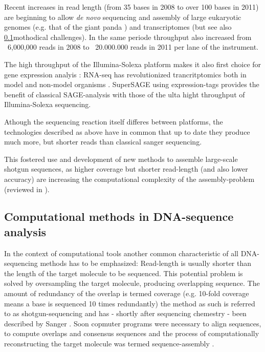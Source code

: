 Recent increases in read length (from 35 bases in 2008 to over 100
bases in 2011) are beginning to allow \textit{de novo} sequencing and
assembly of large eukaryotic genomes (e.g. that of the giant panda
\cite{pmid20010809}) and transcriptomes \cite{pmid21679424} (but see
also \ref{sec:comp-meth-dna}mothodical challenges). In the same
periode throughput also increased from ~6,000,000 reads in 2008 to
~20.000.000 reads in 2011 per lane of the instrument.

The high throughput of the Illumina-Solexa platform makes it also
first choice for gene expression analyis \cite{pmid21627854}: RNA-seq
has revolutionized trancritptomics both in model and non-model
organisms \cite{pmid19015660}. SuperSAGE \cite{pmid20967605} using
expression-tags provides the benefit of classical SAGE-analysis
\cite{pmid7570003} with those of the ulta hight throughput of
Illumina-Solexa sequencing.

Athough the sequencing reaction itself differes between platforms, the
technologies described as above have in common that up to date they
produce much more, but shorter reads than classical sanger sequencing.

This fostered use and development of new methods to assemble
large-scale shotgun sequences, as higher coverage but shorter
read-length (and also lower accuracy) are increasing the computational
complexity of the assembly-problem (reviewed in \cite{pmid20211242}).

\subsection{Computational methods in DNA-sequence analysis}
\label{sec:comp-meth-dna}

In the context of computational tools another common characteristic of
all DNA-sequencing methods has to be emphasized: Read-length is
usually shorter than the length of the target molecule to be
sequenced. This potential problem is solved by oversampling the target
molecule, producing overlapping sequence. The amount of redundancy of
the overlap is termed coverage (e.g. 10-fold coverage means a base is
sequenced 10 times redundantly) the method as such is referred to as
shotgun-sequencing and has - shortly after sequencing chemestry - been
described by Sanger \cite{pmid6260957}. Soon copmuter programs were
necessary to align sequences, to compute overlaps and consensus
sequences \cite{pmid461197} and the process of computationally
reconstructing the target molecule was termed sequence-assembly
\cite{pmid6251542}.


